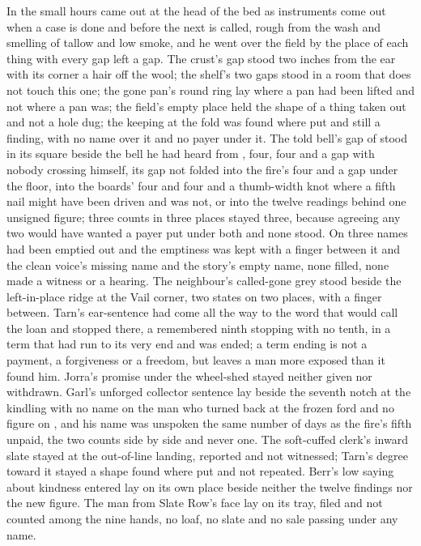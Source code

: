 In the small hours  came out at the head of the bed as instruments come out when a case is done and before the next is called, rough from the wash and smelling of tallow and low smoke, and he went over the field by the place of each thing with every gap left a gap. The crust's gap stood two inches from the ear with its corner a hair off the wool; the shelf's two gaps stood in a room that does not touch this one; the gone pan's round ring lay where a pan had been lifted and not where a pan was; the field's empty place held the shape of a thing taken out and not a hole dug; the keeping at the fold was found where put and still a finding, with no name over it and no payer under it. The told bell's gap of  stood in its square beside the bell he had heard from , four, four and a gap with nobody crossing himself, its gap not folded into the fire's four and a gap under the floor, into the boards' four and four and a thumb-width knot where a fifth nail might have been driven and was not, or into the twelve readings behind one unsigned figure; three counts in three places stayed three, because agreeing any two would have wanted a payer put under both and none stood. On  three names had been emptied out and the emptiness was kept with a finger between it and the clean voice's missing name and the story's empty name, none filled, none made a witness or a hearing. The neighbour's called-gone grey stood beside the left-in-place ridge at the Vail corner, two states on two places, with a finger between. Tarn's ear-sentence had come all the way to the word that would call the loan and stopped there, a remembered ninth stopping with no tenth, in a term that had run to its very end and was ended; a term ending is not a payment, a forgiveness or a freedom, but leaves a man more exposed than it found him. Jorra's promise under the wheel-shed stayed neither given nor withdrawn. Garl's unforged collector sentence lay beside the seventh notch at the kindling with no name on the man who turned back at the frozen ford and no figure on , and his name was unspoken the same number of days as the fire's fifth unpaid, the two counts side by side and never one. The soft-cuffed clerk's inward slate stayed at the out-of-line landing, reported and not witnessed; Tarn's degree toward it stayed a shape found where put and not repeated. Berr's low saying about kindness entered lay on its own place beside neither the twelve findings nor the new figure. The man from Slate Row's face lay on its tray, filed and not counted among the nine hands, no loaf, no slate and no sale passing under any name.

